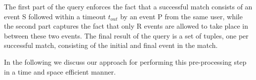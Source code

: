 The first part of the query enforces the fact that a successful match consists
of an event S followed within a timeout $t_{out}$ by an event P from the same 
user,
while the second part captures the fact that only R events are allowed to take
place in between these two events.
The final result of the query is a set of tuples, one per successful match,
consisting of the initial and final event in the match.



In the following we discuss our approach for performing this pre-processing step
in a time and space efficient manner.  

